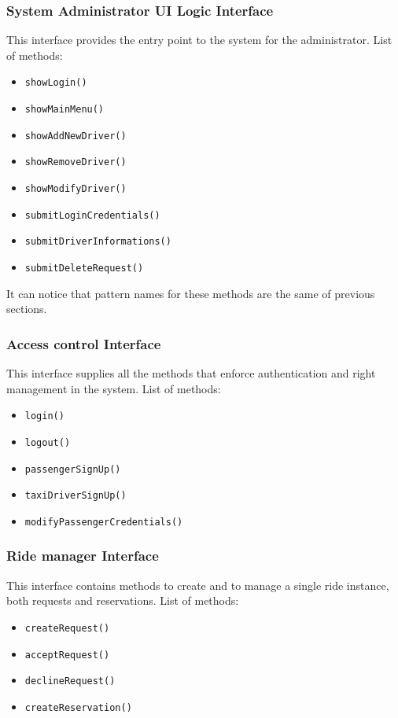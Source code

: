 \subsubsection{System Administrator UI Logic Interface}
This interface provides the entry point to the system for the administrator. \newline
List of methods:
\begin{itemize}
	\item \texttt{showLogin()}
	\item \texttt{showMainMenu()}
	\item \texttt{showAddNewDriver()}
	\item \texttt{showRemoveDriver()}
	\item \texttt{showModifyDriver()}
	\item \texttt{submitLoginCredentials()}
	\item \texttt{submitDriverInformations()}
	\item \texttt{submitDeleteRequest()}
\end{itemize}
It can notice that pattern names for these methods are the same of previous sections.
\subsubsection{Access control Interface}
This interface supplies all the methods that enforce authentication and right management in the system. \newline
List of methods:
\begin{itemize}
	\item \texttt{login()}
	\item \texttt{logout()}
	\item \texttt{passengerSignUp()}
	\item \texttt{taxiDriverSignUp()}
	\item \texttt{modifyPassengerCredentials()}
\end{itemize}
\subsubsection{Ride manager Interface}
This interface contains methods to create and to manage a single ride instance, both requests and reservations. \newline
List of methods:
\begin{itemize}
	\item \texttt{createRequest()}
	\item \texttt{acceptRequest()}
	\item \texttt{declineRequest()}
	\item \texttt{createReservation()}
\end{itemize}
